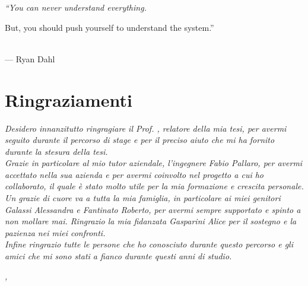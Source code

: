 
\cleardoublepage
{}
{}

\begin{flushright}{
	\slshape    
	``You can never understand everything. 
	
	But, you should push yourself to understand the system.''} \\ 
	\medskip
    --- Ryan Dahl
\end{flushright}


\bigskip

\begingroup
\let\clearpage\relax
\let\cleardoublepage\relax
\let\cleardoublepage\relax

\chapter*{Ringraziamenti}

\noindent \textit{Desidero innanzitutto ringragiare il Prof. \myProf, relatore della mia tesi, per avermi seguito durante il percorso di stage e per il preciso aiuto che mi ha fornito durante la stesura della tesi.} \\

\noindent \textit{Grazie in particolare al mio tutor aziendale, l'ingegnere Fabio Pallaro, per avermi accettato nella sua azienda e per avermi coinvolto nel progetto a cui ho collaborato, il quale è stato molto utile per la mia formazione e crescita personale.} \\

\noindent \textit{Un grazie di cuore va a tutta la mia famiglia, in particolare ai miei genitori Galassi Alessandra e Fantinato Roberto, per avermi sempre supportato e spinto a non mollare mai. Ringrazio la mia fidanzata Gasparini Alice per il sostegno e la pazienza nei miei confronti.}\\

\noindent \textit{Infine ringrazio tutte le persone che ho conosciuto durante questo percorso e gli amici che mi sono stati a fianco durante questi anni di studio.}\\
\bigskip

\noindent\textit{\myLocation, \myTime}
\hfill \myName

\endgroup
